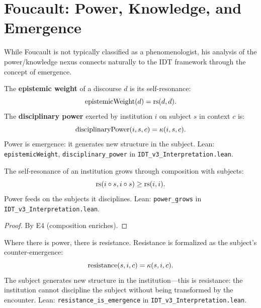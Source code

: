 \section{Foucault: Power, Knowledge, and Emergence}

While Foucault is not typically classified as a phenomenologist, his
analysis of the power/knowledge nexus connects naturally to the IDT
framework through the concept of emergence.

\begin{definition}
\label{def:foucault-power}
The \textbf{epistemic weight} of a discourse $d$ is its self-resonance:
\[
\mathrm{epistemicWeight}(d) = \mathrm{rs}(d, d).
\]
The \textbf{disciplinary power} exerted by institution $i$ on subject $s$
in context $c$ is:
\[
\mathrm{disciplinaryPower}(i, s, c) = \kappa(i, s, c).
\]
Power is emergence: it generates new structure in the subject.
Lean: \texttt{epistemicWeight}, \texttt{disciplinary\_power} in
\texttt{IDT\_v3\_Interpretation.lean}.
\end{definition}

\begin{theorem}
\label{thm:power-grows}
The self-resonance of an institution grows through composition with subjects:
\[
\mathrm{rs}(i \circ s, i \circ s) \geq \mathrm{rs}(i, i).
\]
Power feeds on the subjects it disciplines.
Lean: \texttt{power\_grows} in \texttt{IDT\_v3\_Interpretation.lean}.
\end{theorem}

\begin{proof}
By E4 (composition enriches).
\end{proof}

\begin{theorem}
\label{thm:resistance-emergence}
Where there is power, there is resistance.  Resistance is formalized as
the subject's counter-emergence:
\[
\mathrm{resistance}(s, i, c) = \kappa(s, i, c).
\]
The subject generates new structure in the institution---this is resistance:
the institution cannot discipline the subject without being transformed
by the encounter.
Lean: \texttt{resistance\_is\_emergence} in \texttt{IDT\_v3\_Interpretation.lean}.
\end{theorem}

